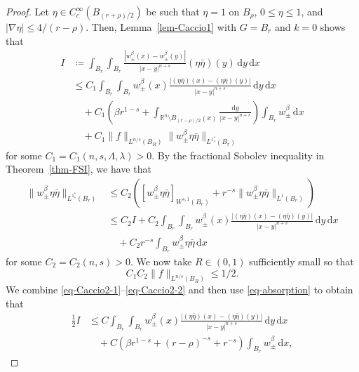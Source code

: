 \documentclass{amsart}
\theoremstyle{plain}
\theoremstyle{definition}
\numberwithin{equation}{section}
\begin{document}
\begin{proof}
Let $\eta \in C^\infty_c(B_{(r+\rho)/2})$ be such that $\eta = 1$ on $B_\rho$, $0 \leq \eta \leq 1$, and $|\nabla \eta| \leq 4/(r-\rho)$. Then, Lemma~\ref{lem-Caccio1} with $G=B_r$ and $k=0$ shows that
\begin{equation}\label{eq-Caccio2-1}
\begin{split}
I
&\coloneqq \int_{B_r} \int_{B_r} \frac{|w_\pm^\beta(x) - w_\pm^\beta(y)|}{|x-y|^{n+s}} (\eta\bar{\eta})(y) \,\mathrm{d}y \,\mathrm{d}x \\
&\leq C_1 \int_{B_r} \int_{B_r} w_\pm^\beta(x) \frac{|(\eta\bar{\eta})(x)-(\eta\bar{\eta})(y)|}{|x-y|^{n+s}} \,\mathrm{d}y \,\mathrm{d}x \\
&\quad + C_1 \left( \beta r^{1-s} + \int_{\mathbb{R}^n \setminus B_{(r-\rho)/2}(x)} \frac{\mathrm{d}y}{|x-y|^{n+s}} \right) \int_{B_r} w_\pm^\beta \,\mathrm{d}x \\
&\quad + C_1 \|f\|_{L^{n/s}(B_R)} \|w_\pm^\beta \eta\bar{\eta}\|_{L^{1^{\ast}_s}(B_r)}
\end{split}
\end{equation}
for some $C_1=C_1(n, s, \Lambda, \lambda)>0$. By the fractional Sobolev inequality in Theorem~\ref{thm-FSI}, we have that
\begin{equation}\label{eq-Caccio2-2}
\begin{split}
\|w_\pm^\beta\eta\bar{\eta}\|_{L^{1^{\ast}_s}(B_r)}
&\leq C_2 \left( [w_\pm^\beta\eta\bar{\eta}]_{W^{s, 1}(B_r)} + r^{-s} \|w_\pm^\beta\eta\bar{\eta}\|_{L^1(B_r)} \right) \\
&\leq C_2 I + C_2 \int_{B_r} \int_{B_r} w_\pm^\beta(x) \frac{|(\eta\bar{\eta})(x)-(\eta\bar{\eta})(y)|}{|x-y|^{n+s}} \,\mathrm{d}y \,\mathrm{d}x \\
&\quad + C_2 r^{-s} \int_{B_r} w_\pm^\beta \eta\bar{\eta} \,\mathrm{d}x
\end{split}
\end{equation}
for some $C_2=C_2(n, s)>0$. We now take $R \in (0, 1)$ sufficiently small so that
\begin{equation}\label{eq-absorption}
C_1 C_2 \|f\|_{L^{n/s}(B_R)} \leq 1/2.
\end{equation}
We combine \eqref{eq-Caccio2-1}--\eqref{eq-Caccio2-2} and then use \eqref{eq-absorption} to obtain that
\begin{align*}
\frac{1}{2}I
&\leq C \int_{B_r} \int_{B_r} w_\pm^\beta(x) \frac{|(\eta\bar{\eta})(x)-(\eta\bar{\eta})(y)|}{|x-y|^{n+s}} \,\mathrm{d}y \,\mathrm{d}x \\
&\quad + C \left( \beta r^{1-s} + (r-\rho)^{-s} + r^{-s} \right) \int_{B_r} w_\pm^\beta \,\mathrm{d}x,

\end{align*}
\end{proof}
\end{document}
